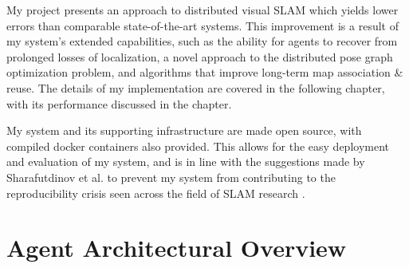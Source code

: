 






\label{sec:3}

My project presents an approach to distributed visual SLAM which yields lower errors than comparable state-of-the-art systems. This improvement is a result of my system's extended capabilities, such as the ability for agents to recover from prolonged losses of localization, a novel approach to the distributed pose graph optimization problem, and algorithms that improve long-term map association \& reuse. The details of my implementation are covered in the following chapter, with its performance discussed in the  chapter.


My system and its supporting infrastructure are made open source, with compiled docker containers also provided. This allows for the easy deployment and evaluation of my system, and is in line with the suggestions made by Sharafutdinov et al. to prevent my system from contributing to the reproducibility crisis seen across the field of SLAM research \autocite{DBLP:journals/corr/abs-2108-01654}.

\section{Agent Architectural Overview}
\label{sec:architectural-overview}

